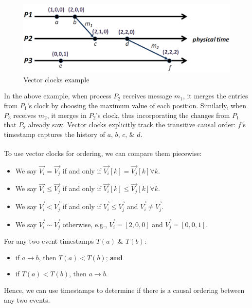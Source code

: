 \documentclass[a4paper,11pt]{article}
\begin{document}
\begin{figure}[H]
    \centering
    \includegraphics[width=\textwidth]{./images/vector_clocks_example.png}
    \caption{Vector clocks example}
\end{figure}

In the above example, when process $P_2$ receives message $m_1$, it merges the entries from $P_1$'s clock by choosing the maximum value of each position.
Similarly, when $P_3$ receives $m_2$, it merges in $P_2$'s clock, thus incorporating the changes from $P_1$ that $P_2$ already saw. 
Vector clocks explicitly track the transitive causal order: $f$'s timestamp captures the history of $a$, $b$, $c$, \& $d$.
\\\\
To use vector clocks for ordering, we can compare them piecewise:
\begin{itemize}
    \item   We say $\vec{V_i} = \vec{V_j}$ if and only if $\vec{V_i}[k] = \vec{V_j}[k] \forall k$.
    \item   We say $\vec{V_i} \leq \vec{V_j}$ if and only if $\vec{V_i}[k] \leq \vec{V_j}[k] \forall k$.
    \item   We say $\vec{V_i} < \vec{V_j}$ if and only if $\vec{V_i} \leq \vec{V_j}$ and $\vec{V_i} \neq \vec{V_j}$.
    \item   We say $\vec{V_i} \sim \vec{V_j}$ otherwise, e.g., $\vec{V_i} = [2,0,0]$ and $\vec{V_j} = [0,0,1]$.
\end{itemize}

For any two event timestamps $T(a)$ \& $T(b)$:
\begin{itemize}
    \item   if $a \rightarrow b$, then $T(a) < T(b)$; \textbf{and}
    \item   if $T(a) < T(b)$, then $a \rightarrow b$.
\end{itemize}

Hence, we can use timestamps to determine if there is a causal ordering between any two events.
\end{document}
